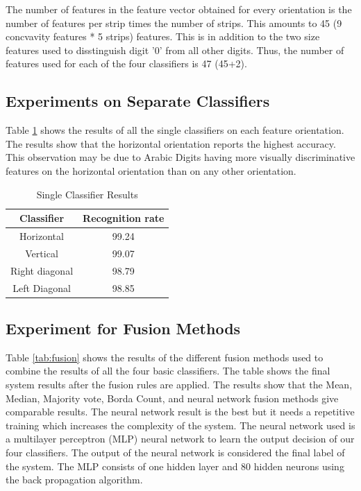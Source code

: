 \documentclass[conference]{IEEEtran}
\begin{document}
The number of features in  the feature vector obtained for every orientation is the number of features  per strip times the number of strips. This amounts to 45 (9 concvavity features * 5 strips) features. This is in addition to the two size features used to disstinguish digit '0' from all other digits. Thus, the number of features used for each of the four classifiers is 47 (45+2).

\subsection{Experiments on Separate Classifiers}

 Table \ref{tab:numberOfstrips} shows the results of all the single classifiers on each feature orientation. The results show that the horizontal orientation reports the highest accuracy. This observation may be due to Arabic Digits having more visually discriminative features on the horizontal orientation than on any other orientation.

 \begin{table}
 \centering
\caption[Single Classifier Results]{Single Classifier Results}
 \begin{tabular}{|c|c|}
  \hline
Classifier & Recognition rate \\  \hline \hline
Horizontal &99.24	 \\ \hline
Vertical &99.07 \\  \hline
Right diagonal &98.79\\  \hline
Left Diagonal  & 98.85\\  \hline

\end{tabular}
\label{tab:numberOfstrips}
\end{table}


\subsection{Experiment for Fusion Methods}

Table \ref{tab:fusion} shows the results of the different fusion methods used to combine the results of all the four basic classifiers. The table shows the final system results after the fusion rules are applied. The results show that the Mean, Median, Majority vote, Borda Count, and neural network fusion methods give comparable results. The neural network result is the best but it needs a repetitive training which increases the complexity of the system. The neural network used is a multilayer perceptron (MLP) neural network to learn the output decision of our four classifiers. The output of the neural network is considered the final label of the system. The MLP consists of one hidden layer and 80 hidden neurons using the back propagation algorithm.
\end{document}
